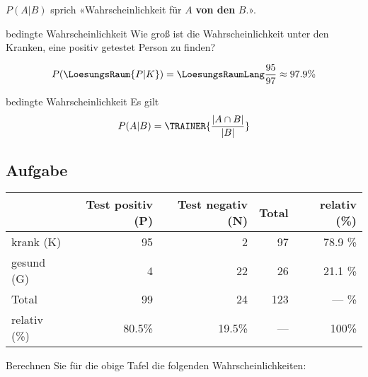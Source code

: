 \begin{bemerkung}{}{}
  $P(A|B)$ sprich «Wahrscheinlichkeit für $A$ \textbf{von den} $B$.».

\end{bemerkung}

\begin{beispiel}{bedingte Wahrscheinlichkeit}{}
  Wie groß ist die Wahrscheinlichkeit unter den Kranken, eine positiv
  getestet Person zu finden?

  \leserluft

  $$P(\LoesungsRaum{P|K})  = \LoesungsRaumLang{\frac{95}{97} \approx 97.9\%}$$
\end{beispiel}

\begin{gesetz}{bedingte Wahrscheinlichkeit}{}
  Es gilt
  $$P(A|B) = \TRAINER{\frac{|A\cap B|}{|B|}}$$  
\end{gesetz}

\newpage


\subsection*{Aufgabe}

  \begin{tabular}{|l|r|r|r|r|}\hline
                 & Test positiv (P) & Test negativ (N)& Total & relativ (\%) \\\hline
    krank (K)    & 95               & 2               & 97    & 78.9 \%      \\\hline    
    gesund (G)   & 4                & 22              & 26    & 21.1 \%      \\\hline
    Total        & 99               & 24              & 123   &  --- \%      \\\hline
    relativ (\%) & 80.5\%           &19.5\%           & ---   &   100\%      \\\hline
  \end{tabular}

Berechnen Sie für die obige Tafel die folgenden Wahrscheinlichkeiten:


